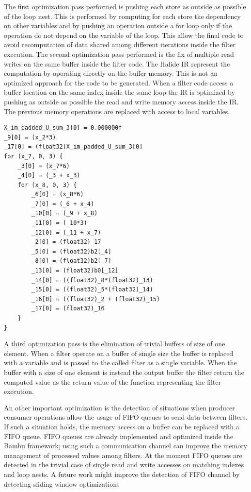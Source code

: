 \documentclass[../main.tex]{subfiles}
\begin{document}
The first optimization pass performed is pushing each store as outside as possible of the loop nest. This is performed by computing for each store the dependency on other variables and by pushing an operation outside a for loop only if the operation do not depend on the variable of the loop. This allow the final code to avoid recomputation of data shared among different iterations inside the filter execution.
The second optimization pass performed is the fix of multiple read writes on the same buffer inside the filter code. The Halide IR represent the computation by operating directly on the buffer memory. This is not an optimized approach for the code to be generated. When a filter code access a buffer location on the same index inside the same loop the IR is optimized by pushing as outside as possible the read and write memory access inside the IR. The previous memory operations are replaced with access to local variables. 

\newpage
\begin{lstlisting}[caption = Example of optimized IR. The complex operation of the previous example has been split into simple operations. Intermediate results that are shared among different iterations and memory accesses has been pushed outside]
X_im_padded_U_sum_3[0] = 0.000000f
_9[0] = (x_2*3)
_17[0] = (float32)X_im_padded_U_sum_3[0]
for (x_7, 0, 3) {
    _3[0] = (x_7*6)
    _4[0] = (_3 + x_3)
    for (x_8, 0, 3) {
        _6[0] = (x_8*6)
        _7[0] = (_6 + x_4)
        _10[0] = (_9 + x_8)
        _11[0] = (_10*3)
        _12[0] = (_11 + x_7)
        _2[0] = (float32)_17
        _5[0] = (float32)b2[_4]
        _8[0] = (float32)b2[_7]
        _13[0] = (float32)b0[_12]
        _14[0] = ((float32)_8*(float32)_13)
        _15[0] = ((float32)_5*(float32)_14)
        _16[0] = ((float32)_2 + (float32)_15)
        _17[0] = (float32)_16
    }
}
\end{lstlisting}

\bigskip

A third optimization pass is the elimination of trivial buffers of size of one element. When a filter operate on a buffer of single size the buffer is replaced with a variable and is passed to the called filter as a single variable. When the buffer with a size of one element is instead the output buffer the filter return the computed value as the return value of the function representing the filter execution.

An other important optimization is the detection of situations when producer consumer operations allow the usage of FIFO queues to send data between filters. 
If such a situation holds, the memory access on a buffer can be replaced with a FIFO queue. 
FIFO queues are already implemented and optimized inside the Bambu framework; using such a communication channel can improve the memory management of processed values among filters.
At the moment FIFO queues are detected in the trivial case of single read and write accesses on matching indexes and loop nests. 
A future work might improve the detection of FIFO channel by detecting sliding window optimizations 
\end{document}
